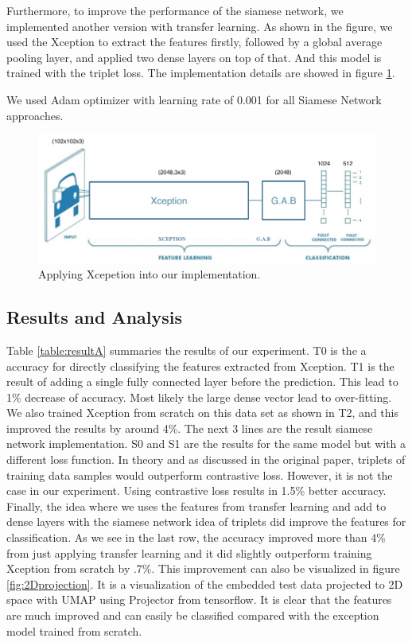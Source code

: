 Furthermore, to improve the performance of the siamese network, we implemented another version with transfer learning. As shown in the figure, we used the Xception to extract the features firstly, followed by a global average pooling layer, and applied two dense layers on top of that. And this model is trained with the triplet loss. The implementation details are showed in figure \ref{fig:xception_cnn}. 

We used Adam optimizer with learning rate of 0.001 for all Siamese Network approaches. 

\begin{figure}[h]
  \centering
  \includegraphics[width=\linewidth]{figs/xception_cnn.png}
  \caption{Applying  Xcepetion into our implementation.}
  \label{fig:xception_cnn}
\end{figure}

\subsection{Results and Analysis}
Table \ref{table:resultA} summaries the results of our experiment. T0 is the a accuracy for directly classifying the features extracted from Xception. T1 is the result of adding a single fully connected layer before the prediction. This lead to 1\% decrease of accuracy. Most likely the large dense vector lead to over-fitting. We also trained Xception from scratch on this data set as shown in T2, and this improved the results by around 4\%. The next 3 lines are the result siamese network implementation. S0 and S1 are the results for the same model but with a different loss function. In theory and as discussed in the original paper, triplets of training data samples would outperform contrastive loss. However, it is not the case in our experiment. Using contrastive loss results in 1.5\% better accuracy. Finally, the idea where we uses the features from transfer learning and add to dense layers with the siamese network idea of triplets did improve the features for classification. As we see in the last row, the accuracy improved more than 4\% from just applying transfer learning and it did slightly outperform training Xception from scratch by .7\%. This improvement can also be visualized in figure \ref{fig:2Dprojection}. It is a visualization of the embedded test data projected to 2D space with UMAP using Projector from tensorflow. It is clear that the features are much improved and can easily be classified compared with the exception model trained from scratch.

